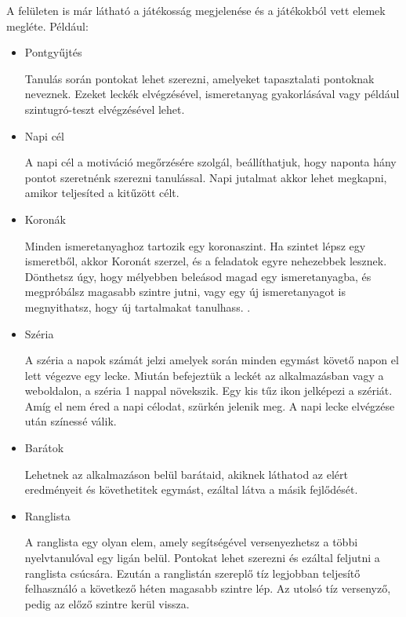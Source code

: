A felületen is már látható a játékosság megjelenése és a játékokból vett elemek megléte. Például:
\begin{itemize}
  \item {Pontgyűjtés}
        \begin{addmargin}[\parindent]{0pt}
          Tanulás során pontokat lehet szerezni, amelyeket tapasztalati pontoknak neveznek. Ezeket leckék elvégzésével, ismeretanyag gyakorlásával vagy például szintugró-teszt elvégzésével lehet.
        \end{addmargin}
  \item Napi cél
        \begin{addmargin}[\parindent]{0pt}
          A napi cél a motiváció megőrzésére szolgál, beállíthatjuk, hogy naponta hány pontot szeretnénk szerezni tanulással. Napi jutalmat akkor lehet megkapni, amikor teljesíted a kitűzött célt.
        \end{addmargin}
  \item Koronák
        \begin{addmargin}[\parindent]{0pt}
          Minden ismeretanyaghoz tartozik egy koronaszint. Ha szintet lépsz egy ismeretből, akkor Koronát szerzel, és a feladatok egyre nehezebbek lesznek. Dönthetsz úgy, hogy mélyebben beleásod magad egy ismeretanyagba, és megpróbálsz magasabb szintre jutni, vagy egy új ismeretanyagot is megnyithatsz, hogy új tartalmakat tanulhass. \cite{koronaszintekDuolingo}.
        \end{addmargin}
  \item Széria
        \begin{addmargin}[\parindent]{0pt}
          A széria a napok számát jelzi amelyek során minden egymást követő napon el lett végezve egy lecke. Miután befejeztük a leckét az alkalmazásban vagy a weboldalon, a széria 1 nappal növekszik. Egy kis tűz ikon jelképezi a szériát. Amíg el nem éred a napi célodat, szürkén jelenik meg. A napi lecke elvégzése után színessé válik. \cite{szeriaDuolingo}
        \end{addmargin}
  \item Barátok
        \begin{addmargin}[\parindent]{0pt}
          Lehetnek az alkalmazáson belül barátaid, akiknek láthatod az elért eredményeit és követhetitek egymást, ezáltal látva a másik fejlődését.
        \end{addmargin}
  \item Ranglista
        \begin{addmargin}[\parindent]{0pt}
          A ranglista egy olyan elem, amely segítségével versenyezhetsz a többi nyelvtanulóval egy ligán belül. Pontokat lehet szerezni és ezáltal feljutni a ranglista csúcsára. Ezután a ranglistán szereplő tíz legjobban teljesítő felhasználó a következő héten magasabb szintre lép. Az utolsó tíz versenyző, pedig az előző szintre kerül vissza.
        \end{addmargin}
\end{itemize}

